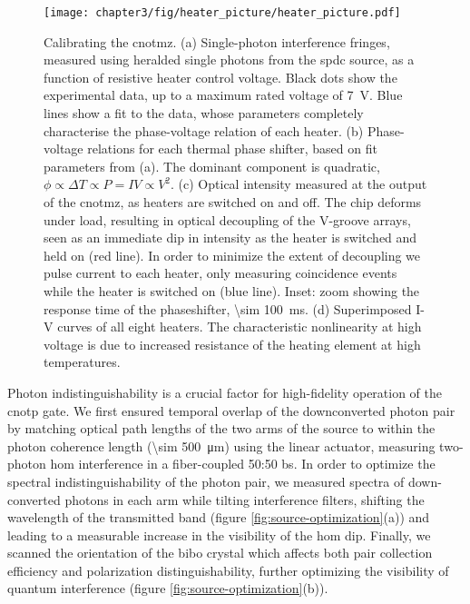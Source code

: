 \begin{figure}[t!]
\centering
\texttt{[image: chapter3/fig/heater\_picture/heater\_picture.pdf]}
\caption[Calibrating the \acrshort{cnotmz}]
{
Calibrating the \gls{cnotmz}. (a) Single-photon interference fringes, measured using heralded single photons from the \gls{spdc} source, as a function of resistive heater control voltage. Black dots show the experimental data, up to a maximum rated voltage of \SI{7}{\volt}. Blue lines show a fit to the data, whose parameters completely characterise the phase-voltage relation of each heater. (b) Phase-voltage relations for each thermal phase shifter, based on fit parameters from (a). The dominant component is quadratic, $\phi \propto \Delta T \propto P = IV \propto V^2$. (c) Optical intensity measured at the output of the \gls{cnotmz}, as heaters are switched on and off. The chip deforms under load, resulting in optical decoupling of the V-groove arrays, seen as an immediate dip in intensity as the heater is switched and held on (red line). In order to minimize the extent of decoupling we pulse current to each heater, only measuring coincidence events while the heater is switched on (blue line). Inset: zoom showing the response time of the phaseshifter, \SI{\sim 100}{\milli \second}. (d) Superimposed I-V curves of all eight heaters. The characteristic nonlinearity at high voltage is due to increased resistance of the heating element at high temperatures.
}
\label{fig:calibration}
\end{figure}

Photon indistinguishability is a crucial factor for high-fidelity operation of the \gls{cnotp} gate. We first ensured temporal overlap of the downconverted photon pair by matching optical path lengths of the two arms of the source to within the photon coherence length (\SI{\sim 500}{\micro\metre}) using the linear actuator, measuring two-photon \gls{hom} interference in a fiber-coupled 50:50 \gls{bs}.  In order to optimize the spectral indistinguishability of the photon pair, we measured spectra of down-converted photons in each arm while tilting interference filters, shifting the wavelength of the transmitted band (figure \ref{fig:source-optimization}(a)) and leading to a measurable increase in the visibility of the \gls{hom} dip. Finally, we scanned the orientation of the \gls{bibo} crystal which affects both pair collection efficiency and polarization distinguishability, further optimizing the visibility of quantum interference (figure \ref{fig:source-optimization}(b)).

